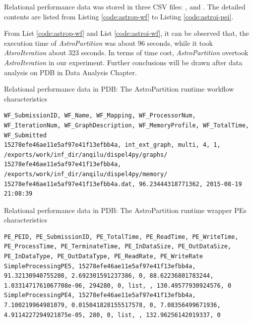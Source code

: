 \documentclass[10pt,twoside,openright,logo]{report}
\begin{document}
Relational performance data was stored in three CSV files: \textit{}, \textit{} and \textit{}. The detailed contents are listed from Listing \ref{code:astrop-wf} to Listing \ref{code:astroi-pei}.

From List \ref{code:astrop-wf} and List \ref{code:astroi-wf}, it can be observed that, the execution time of \textit{AstroPartition} was about 96 seconds, while it took \textit{AtsroIteration} about 323 seconds. In terms of time cost, \textit{AstroPartition} overtook \textit{AstroIteration} in our experiment. Further conclusions will be drawn after data analysis on PDB in Data Analysis Chapter.

\begin{listing}
\caption{Relational performance data in PDB: The AstroPartition runtime workflow characteristics}
\label{code:astrop-wf}
\begin{verbatim}
WF_SubmissionID, WF_Name, WF_Mapping, WF_ProcessorNum, WF_IterationNum, WF_GraphDescription, WF_MemoryProfile, WF_TotalTime, WF_Submitted
15278efe46ae11e5af97e41f13efbb4a, int_ext_graph, multi, 4, 1, /exports/work/inf_dir/anqilu/dispel4py/graphs/ 15278efe46ae11e5af97e41f13efbb4a, /exports/work/inf_dir/anqilu/dispel4py/memory/ 15278efe46ae11e5af97e41f13efbb4a.dat, 96.23444318771362, 2015-08-19 21:08:39
\end{verbatim}
\end{listing}

\begin{listing}
\caption{Relational performance data in PDB: The AstroPartition runtime wrapper PEs characteristics}
\label{code:astrop-pe}
\begin{verbatim}
PE_PEID, PE_SubmissionID, PE_TotalTime, PE_ReadTime, PE_WriteTime, PE_ProcessTime, PE_TerminateTime, PE_InDataSize, PE_OutDataSize, PE_InDataType, PE_OutDataType, PE_ReadRate, PE_WriteRate
SimpleProcessingPE5, 15278efe46ae11e5af97e41f13efbb4a, 91.32130940755208, 2.692301591237386, 0, 88.62236801783244, 1.0331471761067708e-06, 294280, 0, list, , 130.49577930924576, 0
SimpleProcessingPE4, 15278efe46ae11e5af97e41f13efbb4a, 7.100219964981079, 0.015041828155517578, 0, 7.08356499671936, 4.9114227294921875e-05, 280, 0, list, , 132.96256142019337, 0
\end{verbatim}
\end{listing}
\end{document}
